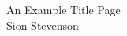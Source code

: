 \documentclass{article}
\begin{document}
\begin{titlepage}
\centering
\huge
\bfseries

\vspace*{120pt}
An Example Title Page \\[25pt]
Sion Stevenson

\end{titlepage}
\end{document}
